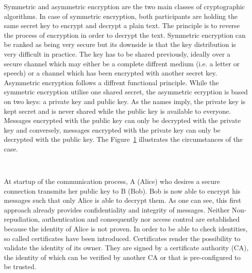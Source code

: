 Symmetric and asymmetric encryption are the two main classes of cryptographic algorithms.
In case of symmetric encryption, both participants are holding the same secret key to encrypt and decrypt a plain text.
The principle is to reverse the process of encryption in order to decrypt the text.
Symmetric encryption can be ranked as being very secure but its downside is that the key distribution is very difficult in practice.
The key has to be shared previously, ideally over a secure channel which may either be a complete diffrent medium (i.e. a letter or speech) or a channel which has been encrypted with another secret key.
Asymmetric encryption follows a diffrent functional principle.
While the symmetric encryption utilise one shared secret, the asymmetric ecryption is based on two keys: a private key and public key.
As the names imply, the private key is kept secret and is never shared while the public key is available to everyone.
Messages encrypted with the public key can only be decrypted with the private key and conversely, messages encrypted with the private key can only be decrypted with the public key. 
The Figure~\ref{fig:asymmetric_encryption} illustrates the circumstances of the case.
\begin{figure}[htb]
	\centering%
	\\
	\label{fig:asymmetric_encryption}
\end{figure}


At startup of the communication process, A (Alice) who desires a secure connection transmits her public key to B (Bob).
Bob is now able to encrypt his messages such that only Alice is able to decrypt them.
As one can see, this first approach already provides confidentiality and integrity of messages.
Neither Non-repudiation, authentication and consequently nor access control are established because the identity of Alice is not proven.
In order to be able to check identities, so called certificates have been introduced.
Certificates render the possibility to validate the identity of its owner.
They are signed by a certificate authority (CA), the identity of which can be verified by another CA or that is pre-configured to be trusted.\\


